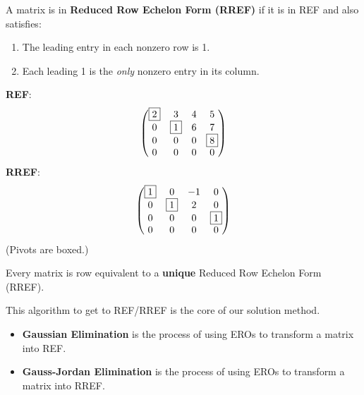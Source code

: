 \begin{definition}
A matrix is in \textbf{Reduced Row Echelon Form (RREF)} if it is in REF and also satisfies:
\begin{enumerate}
    \item The leading entry in each nonzero row is 1.
    \item Each leading 1 is the \emph{only} nonzero entry in its column.
\end{enumerate}
\end{definition}



\begin{example}
\textbf{REF}:
\[ \begin{pmatrix} \fbox{2} & 3 & 4 & 5 \\ 0 & \fbox{1} & 6 & 7 \\ 0 & 0 & 0 & \fbox{8} \\ 0 & 0 & 0 & 0 \end{pmatrix} \]
\textbf{RREF}:
\[ \begin{pmatrix} \fbox{1} & 0 & -1 & 0 \\ 0 & \fbox{1} & 2 & 0 \\ 0 & 0 & 0 & \fbox{1} \\ 0 & 0 & 0 & 0 \end{pmatrix} \]
(Pivots are boxed.)
\end{example}

\begin{theorem}
Every matrix is row equivalent to a \textbf{unique} Reduced Row Echelon Form (RREF).
\end{theorem}

This algorithm to get to REF/RREF is the core of our solution method.

\begin{definition}
\begin{itemize}
    \item \textbf{Gaussian Elimination} is the process of using EROs to transform a matrix into REF.
    \item \textbf{Gauss-Jordan Elimination} is the process of using EROs to transform a matrix into RREF.
\end{itemize}
\end{definition}

